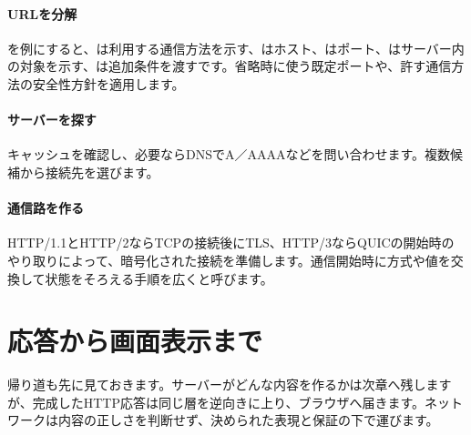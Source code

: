 \begingroup
  \centering
  \vspace{5mm}
\begingroup
\paragraph{URLを分解}
        を例にすると、は利用する通信方法を示す、はホスト、はポート、はサーバー内の対象を示す、は追加条件を渡すです。省略時に使う既定ポートや、許す通信方法の安全性方針を適用します。

\par
\endgroup
\medskip
\begingroup
\paragraph{サーバーを探す}
        キャッシュを確認し、必要ならDNSでA／AAAAなどを問い合わせます。複数候補から接続先を選びます。

\par
\endgroup
\medskip
\begingroup
\paragraph{通信路を作る}
        HTTP/1.1とHTTP/2ならTCPの接続後にTLS、HTTP/3ならQUICの開始時のやり取りによって、暗号化された接続を準備します。通信開始時に方式や値を交換して状態をそろえる手順を広くと呼びます。

\par
\endgroup
\par
\endgroup


\section{応答から画面表示まで}
\label{sec:05-network-20}

帰り道も先に見ておきます。サーバーがどんな内容を作るかは次章へ残しますが、完成したHTTP応答は同じ層を逆向きに上り、ブラウザへ届きます。ネットワークは内容の正しさを判断せず、決められた表現と保証の下で運びます。

